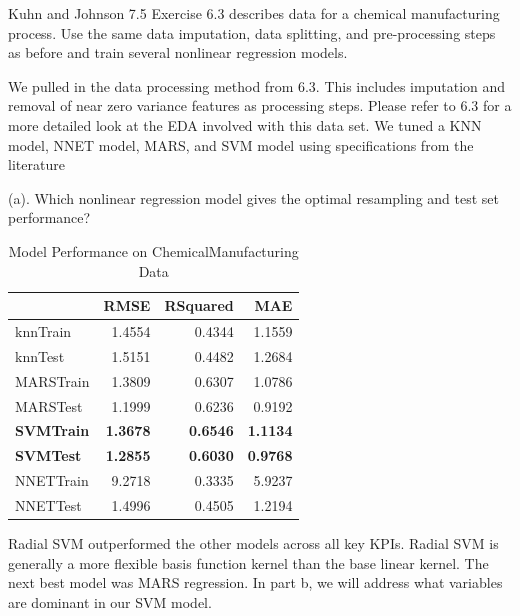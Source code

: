 \documentclass[]{report}
\begin{document}

\begin{question}{Kuhn and Johnson 7.5}
Exercise 6.3 describes data for a chemical manufacturing process. Use the same data imputation, data splitting, and pre-processing steps as before and train several nonlinear regression models.
\end{question}

We pulled in the data processing method from 6.3. This includes
imputation and removal of near zero variance features as processing
steps. Please refer to 6.3 for a more detailed look at the EDA involved
with this data set. We tuned a KNN model, NNET model, MARS, and SVM
model using specifications from the literature

\begin{subquestion}{(a).}
Which nonlinear regression model gives the optimal resampling and test set performance? 
\end{subquestion}

\begin{table}[H]

\caption{\label{tab:unnamed-chunk-1}Model Performance on ChemicalManufacturing Data}
\centering
\fontsize{8}{10}\selectfont
\begin{tabular}[t]{l|r|r|r}
\hline
\textbf{ } & \textbf{RMSE} & \textbf{RSquared} & \textbf{MAE}\\
\hline
\rowcolor{gray!6}  knnTrain & 1.4554 & 0.4344 & 1.1559\\
\hline
knnTest & 1.5151 & 0.4482 & 1.2684\\
\hline
\rowcolor{gray!6}  MARSTrain & 1.3809 & 0.6307 & 1.0786\\
\hline
MARSTest & 1.1999 & 0.6236 & 0.9192\\
\hline
\rowcolor{gray!6}  \rowcolor[HTML]{d9f2e6}  \textbf{SVMTrain} & \textbf{1.3678} & \textbf{0.6546} & \textbf{1.1134}\\
\hline
\rowcolor[HTML]{d9f2e6}  \textbf{SVMTest} & \textbf{1.2855} & \textbf{0.6030} & \textbf{0.9768}\\
\hline
\rowcolor{gray!6}  NNETTrain & 9.2718 & 0.3335 & 5.9237\\
\hline
NNETTest & 1.4996 & 0.4505 & 1.2194\\
\hline
\end{tabular}
\end{table}

Radial SVM outperformed the other models across all key KPIs. Radial SVM
is generally a more flexible basis function kernel than the base linear
kernel. The next best model was MARS regression. In part b, we will
address what variables are dominant in our SVM model.
\end{document}
